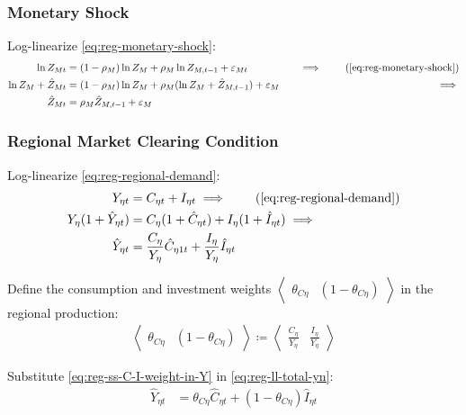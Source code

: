 \documentclass[../thesis.tex]{subfiles}
\begin{document}

\subsubsection*{Monetary Shock}

Log-linearize \ref{eq:reg-monetary-shock}:
\begin{alignat}{2}
	\ln{Z_{Mt}} &= (1-\rho_M)\ln{Z_M} + \rho_M\ln{Z_{M,t-1}} + \varepsilon_{Mt} &\implies \tag{\ref{eq:reg-monetary-shock}} \\
	\ln{Z_{M}} + \hat{Z}_{Mt} &= (1-\rho_M) \ln{Z_M} + \rho_M (\ln{Z_{M}} + \hat{Z}_{M,t-1}) + \varepsilon_{M} \quad &\implies \nonumber \\
	\hat{Z}_{Mt} &= \rho_M \hat{Z}_{M,t-1} + \varepsilon_{M} \label{eq:reg-ll-monetary-shock}
\end{alignat}


\subsubsection*{Regional Market Clearing Condition}

\begin{tcolorbox}[colback=red!5!white,colframe=red!75!black]
	
Log-linearize \ref{eq:reg-regional-demand}:
\begin{align}
	Y_{\eta t} &= C_{\eta t} + I_{\eta t} \implies \tag{\ref{eq:reg-regional-demand}} \\
	Y_{\eta} (1 +\hat{Y}_{\eta t}) &= C_{\eta} (1 +\hat{C}_{\eta t}) + I_{\eta} (1 +\hat{I}_{\eta t}) \implies \nonumber \\
	\hat{Y}_{\eta t} &= \frac{C_{\eta}}{Y_{\eta}} \hat{C}_{\eta 1 t} + \frac{I_{\eta}}{Y_{\eta}} \hat{I}_{\eta t} \label{eq:reg-ll-total-yn}
\end{align}

Define the consumption and investment weights $\left\langle \begin{smallmatrix} \theta_{C\eta} & (1 - \theta_{C\eta}) \end{smallmatrix} \right\rangle$ in the regional production:
\begin{align}
	\left\langle \begin{matrix} \theta_{C\eta} & (1 - \theta_{C\eta}) \end{matrix} \right\rangle \coloneq \left\langle \begin{matrix} \frac{C_{\eta}}{Y_{\eta}} & \frac{I_{\eta}}{Y_{\eta}} \end{matrix} \right\rangle \label{eq:reg-ss-C-I-weight-in-Y}
\end{align}

Substitute \ref{eq:reg-ss-C-I-weight-in-Y} in \ref{eq:reg-ll-total-yn}:
\begin{align}
	\hat{Y}_{\eta t} &= \theta_{C\eta} \hat{C}_{\eta t} + (1 - \theta_{C\eta}) \hat{I}_{\eta t} \label{eq:reg-ll-total-yn-2}
\end{align}

\end{tcolorbox}
\end{document}

